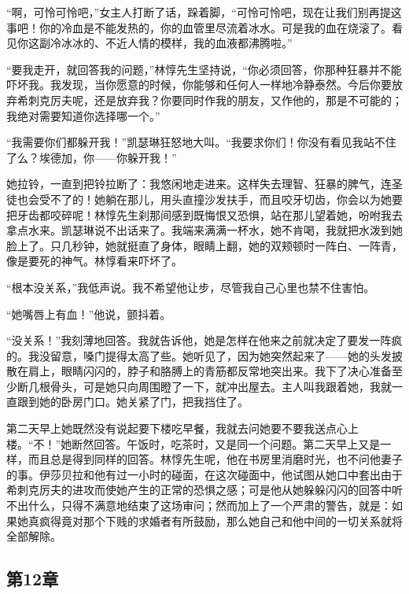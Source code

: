 \par “啊，可怜可怜吧，”女主人打断了话，跺着脚，“可怜可怜吧，现在让我们别再提这事吧！你的冷血是不能发热的，你的血管里尽流着冰水。可是我的血在烧滚了。看见你这副冷冰冰的、不近人情的模样，我的血液都沸腾啦。”
\par “要我走开，就回答我的问题，”林惇先生坚持说，“你必须回答，你那种狂暴并不能吓坏我。我发现，当你愿意的时候，你能够和任何人一样地冷静泰然。今后你要放弃希刺克厉夫呢，还是放弃我？你要同时作我的朋友，又作他的，那是不可能的；我绝对需要知道你选择哪一个。”
\par “我需要你们都躲开我！”凯瑟琳狂怒地大叫。“我要求你们！你没有看见我站不住了么？埃德加，你——你躲开我！”
\par 她拉铃，一直到把铃拉断了：我悠闲地走进来。这样失去理智、狂暴的脾气，连圣徒也会受不了的！她躺在那儿，用头直撞沙发扶手，而且咬牙切齿，你会以为她要把牙齿都咬碎呢！林惇先生刹那间感到既悔恨又恐惧，站在那儿望着她，吩咐我去拿点水来。凯瑟琳说不出话来了。我端来满满一杯水，她不肯喝，我就把水泼到她脸上了。只几秒钟，她就挺直了身体，眼睛上翻，她的双颊顿时一阵白、一阵青，像是要死的神气。林惇看来吓坏了。
\par “根本没关系，”我低声说。我不希望他让步，尽管我自己心里也禁不住害怕。
\par “她嘴唇上有血！”他说，颤抖着。
\par “没关系！”我刻薄地回答。我就告诉他，她是怎样在他来之前就决定了要发一阵疯的。我没留意，嗓门提得太高了些。她听见了，因为她突然起来了——她的头发披散在肩上，眼睛闪闪的，脖子和胳膊上的青筋都反常地突出来。我下了决心准备至少断几根骨头，可是她只向周围瞪了一下，就冲出屋去。主人叫我跟着她，我就一直跟到她的卧房门口。她关紧了门，把我挡住了。
\par 第二天早上她既然没有说起要下楼吃早餐，我就去问她要不要我送点心上楼。“不！”她断然回答。午饭时，吃茶时，又是同一个问题。第二天早上又是一样，而且总是得到同样的回答。林惇先生呢，他在书房里消磨时光，也不问他妻子的事。伊莎贝拉和他有过一小时的碰面，在这次碰面中，他试图从她口中套出由于希刺克厉夫的进攻而使她产生的正常的恐惧之感；可是他从她躲躲闪闪的回答中听不出什么，只得不满意地结束了这场审问；然而加上了一个严肃的警告，就是：如果她真疯得竟对那个下贱的求婚者有所鼓励，那么她自己和他中间的一切关系就将全部解除。


\subsection{第12章}

